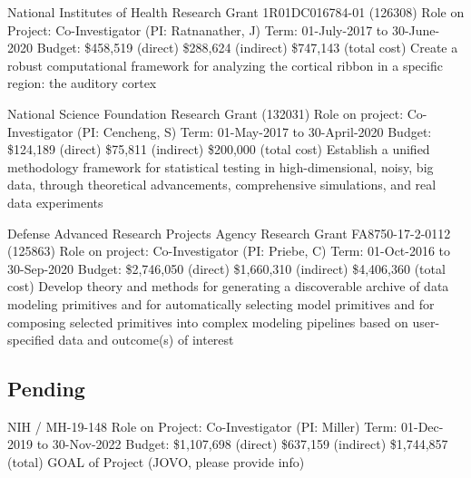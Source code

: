 \documentclass[10pt,colorlinks=true,urlcolor=blue]{moderncv}
\begin{document}
{\newline National Institutes of Health Research Grant 1R01DC016784-01 (126308)
\newline Role on Project: Co-Investigator (PI: Ratnanather, J)
\newline Term: 01-July-2017 to 30-June-2020
\newline Budget: \$458,519 (direct) \$288,624 (indirect) \$747,143 (total cost)
\newline Create a robust computational framework for analyzing the cortical ribbon in a specific
region: the auditory cortex}{}{}{}{}

{\newline National Science Foundation Research Grant (132031)
\newline Role on project: Co-Investigator (PI: Cencheng, S)
\newline Term: 01-May-2017 to 30-April-2020
\newline Budget: \$124,189 (direct) \$75,811 (indirect) \$200,000 (total cost)
\newline Establish a unified methodology framework for statistical testing in high-dimensional, noisy,
big data, through theoretical advancements, comprehensive simulations, and real data
experiments}{}{}{}{}

{\newline Defense Advanced Research Projects Agency Research Grant FA8750-17-2-0112 (125863)
\newline Role on project: Co-Investigator (PI: Priebe, C)
\newline Term: 01-Oct-2016 to 30-Sep-2020
\newline Budget: \$2,746,050 (direct) \$1,660,310 (indirect) \$4,406,360 (total cost)
\newline Develop theory and methods for generating a discoverable archive of data modeling
primitives and for automatically selecting model primitives and for composing selected primitives into complex
modeling pipelines based on user-specified data and outcome(s) of interest}{}{}{}{}

\subsection{Pending}
{\newline NIH / MH-19-148
\newline Role on Project: Co-Investigator (PI: Miller)
\newline Term: 01-Dec-2019 to 30-Nov-2022
\newline Budget: \$1,107,698 (direct) \$637,159 (indirect) \$1,744,857 (total)
\newline GOAL of Project (JOVO, please provide info)}{}{}{}{}
\end{document}
